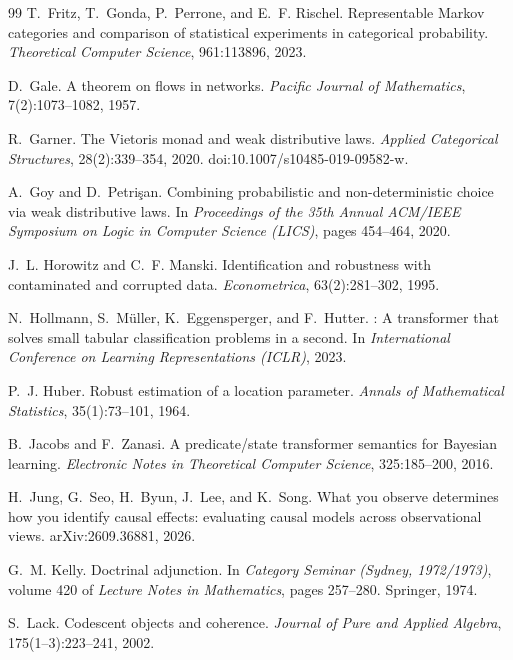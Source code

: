 \documentclass[11pt]{article}
\theoremstyle{definition}
\theoremstyle{remark}
\begin{document}
\begin{thebibliography}{99}
T.~Fritz, T.~Gonda, P.~Perrone, and E.~F. Rischel.
\newblock Representable {M}arkov categories and comparison of statistical experiments in categorical
  probability.
\newblock \emph{Theoretical Computer Science}, 961:113896, 2023.

D.~Gale.
\newblock A theorem on flows in networks.
\newblock \emph{Pacific Journal of Mathematics}, 7(2):1073--1082, 1957.

R.~Garner.
\newblock The {V}ietoris monad and weak distributive laws.
\newblock \emph{Applied Categorical Structures}, 28(2):339--354, 2020.
\newblock doi:10.1007/s10485-019-09582-w.

A.~Goy and D.~Petri\c{s}an.
\newblock Combining probabilistic and non-deterministic choice via weak distributive laws.
\newblock In \emph{Proceedings of the 35th Annual ACM/IEEE Symposium on Logic in Computer Science
  (LICS)}, pages 454--464, 2020.

J.~L. Horowitz and C.~F. Manski.
\newblock Identification and robustness with contaminated and corrupted data.
\newblock \emph{Econometrica}, 63(2):281--302, 1995.

N.~Hollmann, S.~M\"uller, K.~Eggensperger, and F.~Hutter.
: A transformer that solves small tabular classification problems in a second.
\newblock In \emph{International Conference on Learning Representations (ICLR)}, 2023.

P.~J. Huber.
\newblock Robust estimation of a location parameter.
\newblock \emph{Annals of Mathematical Statistics}, 35(1):73--101, 1964.

B.~Jacobs and F.~Zanasi.
\newblock A predicate/state transformer semantics for {B}ayesian learning.
\newblock \emph{Electronic Notes in Theoretical Computer Science}, 325:185--200, 2016.

H.~Jung, G.~Seo, H.~Byun, J.~Lee, and K.~Song.
\newblock What you observe determines how you identify causal effects: evaluating causal models
  across observational views.
\newblock arXiv:2609.36881, 2026.

G.~M. Kelly.
\newblock Doctrinal adjunction.
\newblock In \emph{Category Seminar (Sydney, 1972/1973)}, volume 420 of \emph{Lecture Notes in
  Mathematics}, pages 257--280. Springer, 1974.

S.~Lack.
\newblock Codescent objects and coherence.
\newblock \emph{Journal of Pure and Applied Algebra}, 175(1--3):223--241, 2002.


\end{thebibliography}
\end{document}
